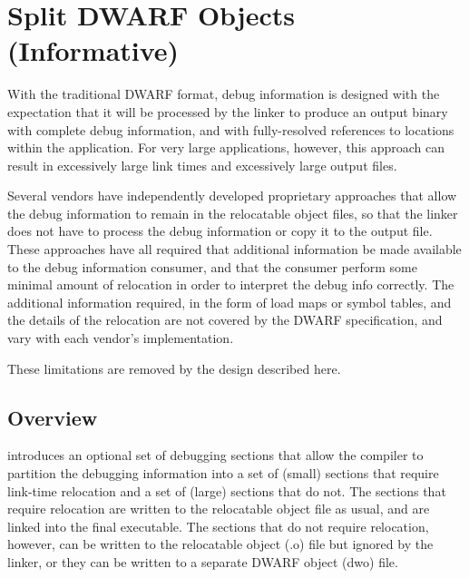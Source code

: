 \chapter[Split DWARF Objects (Informative)]{Split DWARF Objects (Informative)}
\label{app:splitdwarfobjectsinformative}

With the traditional DWARF format, debug information is designed
with the expectation that it will be processed by the linker to
produce an output binary with complete debug information, and
with fully-resolved references to locations within the
application. For very large applications, however, this approach
can result in excessively large link times and excessively large
output files. 

Several vendors have independently developed
proprietary approaches that allow the debug information to remain
in the relocatable object files, so that the linker does not have
to process the debug information or copy it to the output file.
These approaches have all required that additional information be
made available to the debug information consumer, and that the
consumer perform some minimal amount of relocation in order to
interpret the debug info correctly. The additional information
required, in the form of load maps or symbol tables, and the
details of the relocation are not covered by the DWARF
specification, and vary with each vendor's implementation.

These limitations are removed by the design described here.

\section{Overview}
\label{app:splitoverview}
\DWARFVersionV{} introduces an optional set of debugging sections
that allow the compiler to partition the debugging information
into a set of (small) sections that require link-time relocation
and a set of (large) sections that do not. The sections that
require relocation are written to the relocatable object file as
usual, and are linked into the final executable. The sections
that do not require relocation, however, can be written to the
relocatable object (.o) file but ignored by the linker, or they
can be written to a separate DWARF object (dwo{}) file.

